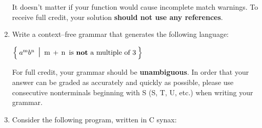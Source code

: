 \documentclass[11pt]{article}
\begin{document}
\begin{enumerate}
\begin{itemize}
          \end{itemize}

          \vspace{-2.5mm}

          It doesn't matter if your function would cause incomplete match
          warnings.  To receive full credit, your solution \textbf{should
          not use any references}.

          \pagebreak


    \item Write a context--free grammar that generates the following
          language:

          \begin{centering}

            \(
              \left\{
                \:
                {a^\mathrm{m}}{b^\mathrm{n}}
                \mbox{\Large \ensuremath{\ \mid \ }}
                \mathrm{m \, + \, n \ \, \textrm{is \textbf{not} a multiple
                        of 3}
                }
                \:
              \right\}
            \)

          \end{centering}

          For full credit, your grammar should be \textbf{unambiguous}.  In
          order that your answer can be graded as accurately and quickly as
          possible, please use consecutive nonterminals beginning with S (S,
          T, U, etc.) when writing your grammar.

          \vspace{4in}

          \underline{\hspace{6.8225in}}

          \medskip

          \begin{centering}

            \scratchpaper[6.8225in]

          \end{centering}

          \pagebreak


    \item Consider the following program, written in C synax:

          \vspace{-3.25mm}


\end{enumerate}
\end{document}
